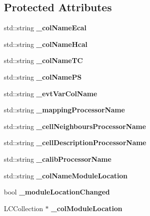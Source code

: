 \subsection*{Protected Attributes}
\begin{DoxyCompactItemize}
\item 
std\-::string {\bfseries \-\_\-col\-Name\-Ecal}\label{classCALICE_1_1DEHEventDisplayProcessor_a3289554659565ea59fab72086c5f7262}

\item 
std\-::string {\bfseries \-\_\-col\-Name\-Hcal}\label{classCALICE_1_1DEHEventDisplayProcessor_ae846c99fb4cfdaa66b66aa97fa08c441}

\item 
std\-::string {\bfseries \-\_\-col\-Name\-T\-C}\label{classCALICE_1_1DEHEventDisplayProcessor_ac3c36067a80e698cc6c57afd080fd774}

\item 
std\-::string {\bfseries \-\_\-col\-Name\-P\-S}\label{classCALICE_1_1DEHEventDisplayProcessor_adde9c073c88b2153ea5c105d8d341cb4}

\item 
std\-::string {\bfseries \-\_\-evt\-Var\-Col\-Name}\label{classCALICE_1_1DEHEventDisplayProcessor_a2e9f79846f709e25102187f5add83f5c}

\item 
std\-::string {\bfseries \-\_\-mapping\-Processor\-Name}\label{classCALICE_1_1DEHEventDisplayProcessor_aa1134a1ba0a930a7d9cf30f3166b21ae}

\item 
std\-::string {\bfseries \-\_\-cell\-Neighbours\-Processor\-Name}\label{classCALICE_1_1DEHEventDisplayProcessor_a45d08934c78bcb6b60f083cb91ca3699}

\item 
std\-::string {\bfseries \-\_\-cell\-Description\-Processor\-Name}\label{classCALICE_1_1DEHEventDisplayProcessor_a82c342737a9c59f3a889b0b32f2526a0}

\item 
std\-::string {\bf \-\_\-calib\-Processor\-Name}
\item 
std\-::string {\bfseries \-\_\-col\-Name\-Module\-Location}\label{classCALICE_1_1DEHEventDisplayProcessor_a03c7635b25f7787509292ddb0bc1c8fb}

\item 
bool {\bfseries \-\_\-module\-Location\-Changed}\label{classCALICE_1_1DEHEventDisplayProcessor_a97ab7f75fca58beab3dba3fbd1c40e40}

\item 
L\-C\-Collection $\ast$ {\bfseries \-\_\-col\-Module\-Location}\label{classCALICE_1_1DEHEventDisplayProcessor_aad3d88faa8b335f007179424e6c32892}


\end{DoxyCompactItemize}

